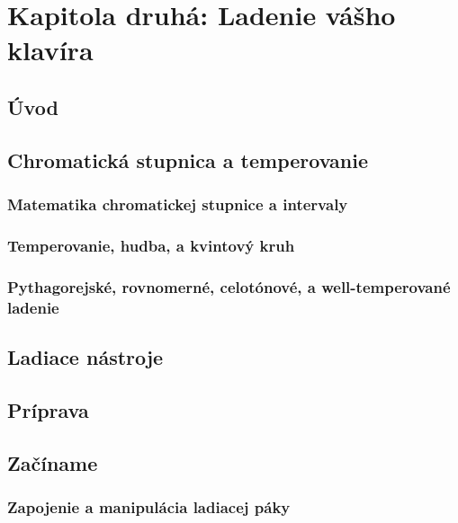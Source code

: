 \renewcommand\thechapter{}
\renewcommand\thesection{\arabic{section}}
\renewcommand\thesubsection{\thesection.\alph{subsection}}
\renewcommand\thesubsubsection{\thesubsection.\arabic{subsubsection}}

\chapter*{Kapitola druhá: Ladenie vášho klavíra}
\setcounter{section}{0}
\section{Úvod}

\section{Chromatická stupnica a temperovanie}

\subsection{Matematika chromatickej stupnice a intervaly}

\subsection{Temperovanie, hudba, a kvintový kruh}

\subsection{Pythagorejské, rovnomerné, celotónové, a well-temperované ladenie}

\section{Ladiace nástroje}

\section{Príprava}

\section{Začíname}

\subsection{Zapojenie a manipulácia ladiacej páky}

